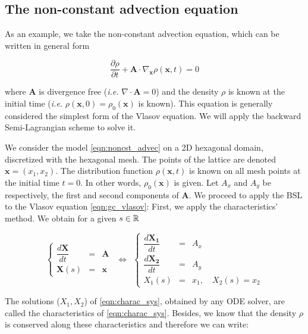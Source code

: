 \documentclass[proc]{edpsmath}
\begin{document}
\subsection{The non-constant advection equation}

As an example, we take the non-constant advection equation, which can be written in general form

\begin{equation}
	\dfrac{\partial \rho}{\partial t} + \mathbf{A} \cdot \nabla_{\mathbf{x}} \rho(\mathbf{x}, t)  = 0
	\label{eqn:noncst_advec}
\end{equation}

where $\mathbf{A}$ is divergence free (\emph{i.e.} $\nabla \cdot \mathbf{A} = 0$) and the density $\rho$ is known at the initial time (\emph{i.e.} $\rho(\mathbf{x}, 0) = \rho_0(\mathbf{x})$ is known). This equation is generally considered the simplest form of the Vlasov equation. We will apply the backward Semi-Lagrangian scheme to solve it.


We consider the model \eqref{eqn:noncst_advec} on a 2D hexagonal domain, discretized with the hexagonal mesh. The points of the lattice are denoted $\mathbf{x}=(x_1, x_2)$. The distribution function $\rho(\mathbf{x},t)$ is known on all mesh points at the initial time $t=0$. In other words, $\rho_0(\mathbf{x})$ is given. Let $A_x$ and $A_y$ be respectively, the first and second components of $\mathbf{A}$. We proceed to apply the BSL to the Vlasov equation \eqref{eqn:gc_vlasov}: First, we apply the characteristics' method. We obtain for a given $s \in \mathbb{R} $

\begin{equation}
	\label{eqn:charac_sys}
	\left\lbrace
	\begin{array}{lcl}
	\displaystyle \dfrac{d \mathbf{X}}{dt} &=& \mathbf{A}\\[0.3cm]
	\displaystyle \mathbf{X}(s) &=& \mathbf{x}
	\end{array}\right.
~~\Longleftrightarrow ~~
	\left\lbrace
	\begin{array}{lcl}
	\displaystyle \dfrac{d \mathbf{X_1}}{dt} &=& A_x\\[0.3cm]
	\displaystyle \dfrac{d \mathbf{X_2}}{dt} &=& A_y\\[0.3cm]
	\displaystyle X_1(s) &=& x_1, \quad   X_2(s) = x_2
	\end{array}\right.
\end{equation}

The solutions ($X_1, X_2$) of \eqref{eqn:charac_sys}, obtained by any ODE solver, are called the characteristics of \eqref{eqn:charac_sys}. Besides, we know that the density $\rho$ is conserved along these characteristics and therefore we can write:
\end{document}
